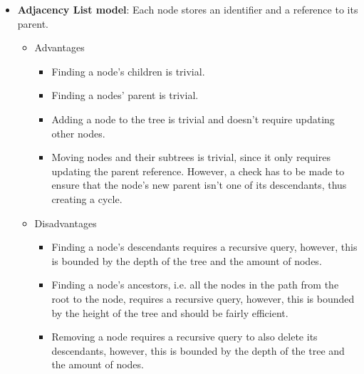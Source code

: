
\begin{itemize}[nolistsep]
	\item \textbf{Adjacency List model}: Each node stores an identifier and a reference to its parent.
	      \begin{itemize}
		      \item Advantages
		            \begin{itemize}
			            \item Finding a node's children is trivial.
			            \item Finding a nodes' parent is trivial.
			            \item Adding a node to the tree is trivial and doesn't require updating other
			                  nodes.
			            \item Moving nodes and their subtrees is trivial, since it only requires updating
			                  the parent reference. However, a check has to be made to ensure that the node's
			                  new parent isn't one of its descendants, thus creating a cycle.
		            \end{itemize}
		      \item Disadvantages
		            \begin{itemize}
			            \item Finding a node's descendants requires a recursive query, however,
			                  this is bounded by the depth of the tree and the amount of nodes.
			            \item Finding a node's ancestors, i.e. all the nodes in the path from the root to
			                  the node, requires a recursive query, however, this is bounded by the height of
			                  the tree and should be fairly efficient.
			            \item Removing a node requires a recursive query to also delete its descendants,
			                  however, this is bounded by the depth of
			                  the tree and the amount of nodes.
		            \end{itemize}
	      \end{itemize}

\end{itemize}
